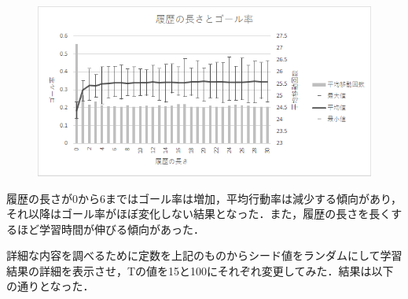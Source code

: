 \documentclass[a4j,11pt]{jarticle}
\begin{document}
\begin{figure}[ht]
  \begin{center}
    \includegraphics[scale=1.5]{img/changeT.png}
  \end{center}
\end{figure}

履歴の長さが0から6まではゴール率は増加，平均行動率は減少する傾向があり，それ以降はゴール率がほぼ変化しない結果となった．また，履歴の長さを長くするほど学習時間が伸びる傾向があった．

詳細な内容を調べるために定数を上記のものからシード値をランダムにして学習結果の詳細を表示させ，Tの値を15と100にそれぞれ変更してみた．結果は以下の通りとなった．

\newpage
\end{document}
